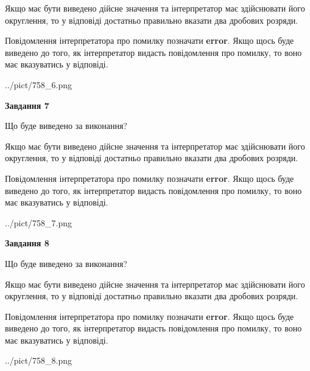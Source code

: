 \documentclass[12pt, ukrainian]{article}
\begin{document}
{\begin {Large}
Якщо має бути виведено дійсне значення та інтерпретатор має здійснювати його округлення, 
то у відповіді достатньо правильно вказати два дробових розряди.

Повідомлення інтерпретатора про помилку позначати \textbf{error}.
Якщо щось буде виведено до того, як інтерпретатор видасть повідомлення про помилку, 
то воно має вказуватись у відповіді. \par

\begin{center}
	{../pict/758_6.png}
\end{center}
\newpage

{\begin {center}\textbf{Завдання 7}\end {center}}\par
Що буде виведено за виконання? \par

Якщо має бути виведено дійсне значення та інтерпретатор має здійснювати його округлення, 
то у відповіді достатньо правильно вказати два дробових розряди.

Повідомлення інтерпретатора про помилку позначати \textbf{error}.
Якщо щось буде виведено до того, як інтерпретатор видасть повідомлення про помилку, 
то воно має вказуватись у відповіді. \par

\begin{center}
	{../pict/758_7.png}
\end{center}
\newpage

{\begin {center}\textbf{Завдання 8}\end {center}}\par
Що буде виведено за виконання? \par

Якщо має бути виведено дійсне значення та інтерпретатор має здійснювати його округлення, 
то у відповіді достатньо правильно вказати два дробових розряди.

Повідомлення інтерпретатора про помилку позначати \textbf{error}.
Якщо щось буде виведено до того, як інтерпретатор видасть повідомлення про помилку, 
то воно має вказуватись у відповіді. \par

\begin{center}
	{../pict/758_8.png}
\end{center}
\newpage


\end{Large}}
\end{document}
